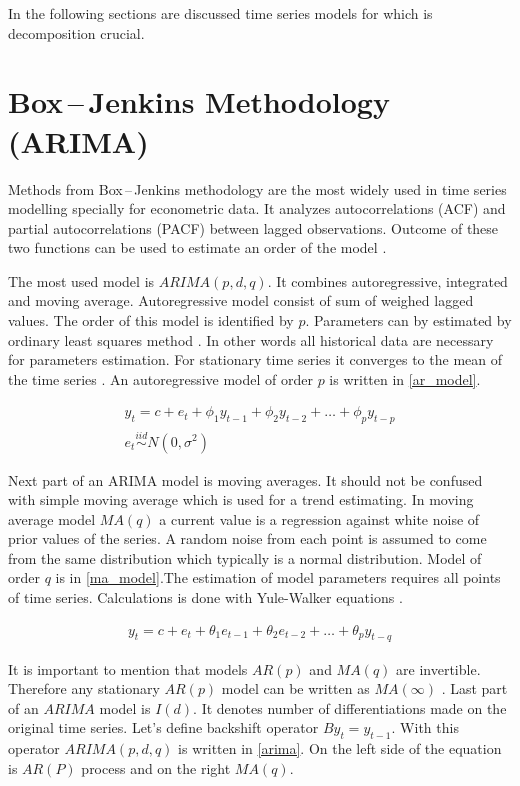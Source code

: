     In the following sections are discussed time series models for which is decomposition
    crucial.

    \section{Box\,--\,Jenkins Methodology (ARIMA)}
    Methods from Box\,--\,Jenkins methodology are the most widely used in time series
    modelling specially for econometric data. It analyzes autocorrelations (ACF) and partial autocorrelations (PACF) between lagged
    observations. Outcome of these two functions can be used to estimate an order of the
    model \cite{cipra}. 

    The most used model is $ARIMA(p, d, q)$. It combines autoregressive, integrated and
    moving average. Autoregressive model consist of sum of weighed lagged values.
    The order of this model is identified by $p$. Parameters can by estimated by ordinary
    least squares method \cite{brockwell}. In other words all historical data are 
    necessary for parameters estimation. For stationary time series it converges to the mean 
    of the time series . An autoregressive model of order $p$ is written in \ref{ar_model}.

    \begin{eqnarray} \label{ar_model}
        y_t = c + e_t + \phi_1 y_{t-1} + \phi_2 y_{t-2} + \dots + \phi_p y_{t-p} \\ \nonumber
        e_t \overset{iid}{\sim} N(0, \sigma^2)
    \end{eqnarray}

    Next part of an ARIMA model is moving averages. It should not be confused with simple moving 
    average which is used for a trend estimating. In moving average model $MA(q)$ a current value is 
    a regression against white noise of prior values of the series. A random noise from 
    each point is assumed to come from the same distribution which typically is 
    a normal distribution. Model of order $q$ is in \ref{ma_model}.The estimation of
    model parameters requires all points of time series. Calculations is done with 
    Yule-Walker equations \cite{brockwell}.

    \begin{eqnarray} \label{ma_model}
        y_t = c + e_t + \theta_1 e_{t-1} + \theta_2 e_{t-2} + \dots + \theta_p y_{t-q}
    \end{eqnarray}

    It is important to mention that models $AR(p)$ and $MA(q)$ are invertible. 
    Therefore any stationary $AR(p)$ model can be written as $MA(\infty)$
    \cite{brockwell}. Last part of an $ARIMA$ model is $I(d)$. It denotes 
    number of differentiations made on the original time series. Let's define 
    backshift operator $By_t=y_{t-1}$. With this operator $ARIMA(p, d, q)$ is
    written in \ref{arima}. On the left side of the equation is $AR(P)$ process 
    and on the right $MA(q)$.


